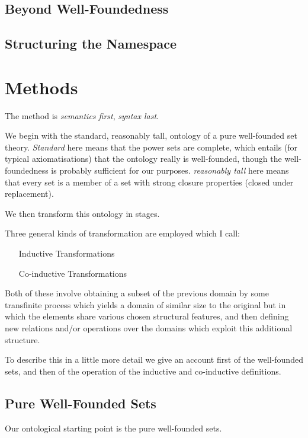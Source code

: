 \documentclass[numreferences]{rbjk}
\begin{document}
\begin{article}
\subsection{Beyond Well-Foundedness}

\subsection{Structuring the Namespace}

\section{Methods}

The method is \emph{semantics first}, \emph{syntax last}.

We begin with the standard, reasonably tall, ontology of a pure well-founded set theory.
\emph{Standard} here means that the power sets are complete, which entails (for typical axiomatisations) that the ontology really is well-founded, though the well-foundedness is probably sufficient for our purposes.
\emph{reasonably tall} here means that every set is a member of a set with strong closure properties (closed under replacement).

We then transform this ontology in stages.

Three general kinds of transformation are employed which I call:

\begin{itemize}
\item[Inductive Transformations]
\item[Co-inductive Transformations]
\end{itemize}

Both of these involve obtaining a subset of the previous domain by some transfinite process which yields a domain of similar size to the original but in which the elements share various chosen structural features, and then defining new relations and/or operations over the domains which exploit this additional structure.

To describe this in a little more detail we give an account first of the well-founded sets, and then of the operation of the inductive and co-inductive definitions.

\subsection{Pure Well-Founded Sets}

Our ontological starting point is the pure well-founded sets.


\end{article}
\end{document}
